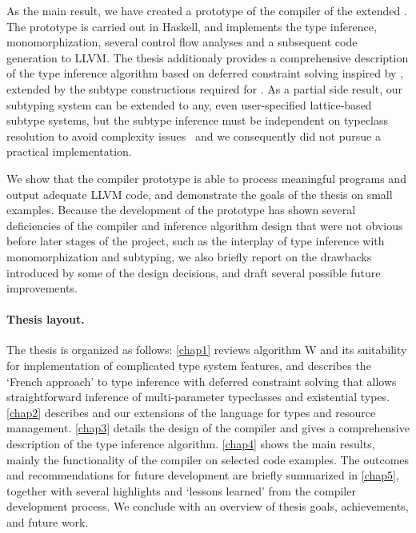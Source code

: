 As the main result, we have created a prototype of the compiler of the extended \cmm. The prototype is carried out in Haskell, and implements the type inference, monomorphization, several control flow analyses and a subsequent code generation to LLVM. The thesis additionaly provides a comprehensive description of the type inference algorithm based on deferred constraint solving inspired by \citet{vytiniotis2011outsidein}, extended by the subtype constructions required for \cmm. As a partial side result, our subtyping system can be extended to any, even user-specified lattice-based subtype systems, but the subtype inference must be independent on typeclass resolution to avoid complexity issues~\cite{tiuryn1992subtype,frey1997subtype} and we consequently did not pursue a practical implementation.

We show that the compiler prototype is able to process meaningful programs and output adequate LLVM code, and demonstrate the goals of the thesis on small examples. Because the development of the prototype has shown several deficiencies of the compiler and inference algorithm design that were not obvious before later stages of the project, such as the interplay of type inference with monomorphization and subtyping, we also briefly report on the drawbacks introduced by some of the design decisions, and draft several possible future improvements.

\paragraph{Thesis layout.}
The thesis is organized as follows:
\cref{chap1} reviews algorithm W and its suitability for implementation of complicated type system features, and describes the `French approach' to type inference with deferred constraint solving that allows straightforward inference of multi-parameter typeclasses and existential types.
\cref{chap2} describes \cmm and our extensions of the language for types and resource management.
\cref{chap3} details the design of the compiler and gives a comprehensive description of the type inference algorithm.
\cref{chap4} shows the main results, mainly the functionality of the compiler on selected code examples.
The outcomes and recommendations for future development are briefly summarized in \cref{chap5}, together with several highlights and `lessons learned' from the compiler development process.
We conclude with an overview of thesis goals, achievements, and future work.
